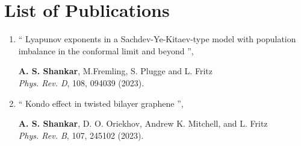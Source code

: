 \newpage
\thispagestyle{empty}

\chapter*{List of Publications}
\label{publications}

\begin{enumerate}[leftmargin=*]
\setlength{\itemsep}{15pt}

    \item   `` Lyapunov exponents in a Sachdev-Ye-Kitaev-type model with population imbalance in the conformal limit and beyond '',
    
         \textbf{A. S. Shankar}, M.Fremling, S. Plugge and L. Fritz  \\
         \textit{Phys. Rev. D}, 108, 094039 (2023). 

         
    \item `` Kondo effect in twisted bilayer graphene '',
    
            \textbf{A. S. Shankar},  D. O. Oriekhov, Andrew K. Mitchell, and L. Fritz \\
            \textit{Phys. Rev. B}, 107, 245102 (2023). 

            



\end{enumerate}


\newpage
\thispagestyle{empty}